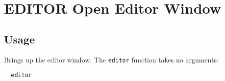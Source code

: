\section{EDITOR Open Editor Window}

\subsection{Usage}

Brings up the editor window.  The \verb|editor| function takes no
arguments:
\begin{verbatim}
  editor
\end{verbatim}

